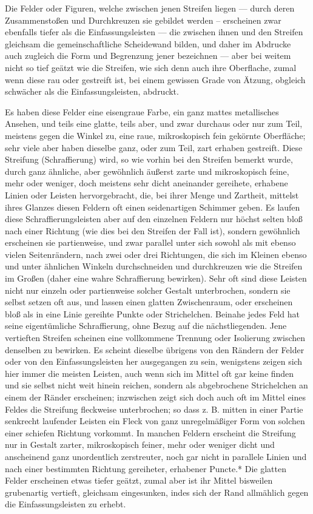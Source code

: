 \documentclass[a4paper, 11pt, oneside, german]{article}
\begin{document}
Die Felder oder Figuren, welche zwischen jenen Streifen liegen --- durch deren Zusammenstoßen und Durchkreuzen sie gebildet werden -- erscheinen zwar ebenfalls tiefer als die Einfassungsleisten --- die zwischen ihnen und den Streifen gleichsam die gemeinschaftliche Scheidewand bilden, und daher im Abdrucke auch zugleich die Form und Begrenzung jener bezeichnen --- aber bei weitem nicht so tief geätzt wie die Streifen, wie sich denn auch ihre Oberflache, zumal wenn diese rau oder gestreift ist, bei einem gewissen Grade von Ätzung, obgleich schwächer als die Einfassungsleisten, abdruckt.

Es haben diese Felder eine eisengraue Farbe, ein ganz mattes metallisches Ansehen, und teils eine glatte, teils aber, und zwar durchaus oder nur zum Teil, meistens gegen die Winkel zu, eine raue, mikroskopisch fein gekörnte Oberfläche; sehr viele aber haben dieselbe ganz, oder zum Teil, zart erhaben gestreift. Diese Streifung (Schraffierung) wird, so wie vorhin bei den Streifen bemerkt wurde, durch ganz ähnliche, aber gewöhnlich äußerst zarte und mikroskopisch feine, mehr oder weniger, doch meistens sehr dicht aneinander gereihete, erhabene Linien oder Leisten hervorgebracht, die, bei ihrer Menge und Zartheit, mittelst ihres Glanzes diesen Feldern oft einen seidenartigen Schimmer geben. Es laufen diese Schraffierungsleisten aber auf den einzelnen Feldern nur höchst selten bloß nach einer Richtung (wie dies bei den Streifen der Fall ist), sondern gewöhnlich erscheinen sie partienweise, und zwar parallel unter sich sowohl als mit ebenso vielen Seitenrändern, nach zwei oder drei Richtungen, die sich im Kleinen ebenso und unter ähnlichen Winkeln durchschneiden und durchkreuzen wie die Streifen im Großen (daher eine wahre Schraffierung bewirken). Sehr oft sind diese Leisten nicht nur einzeln oder partienweise solcher Gestalt unterbrochen, sondern sie selbst setzen oft aus, und lassen einen glatten Zwischenraum, oder erscheinen bloß als in eine Linie gereihte Punkte oder Strichelchen. Beinahe jedes Feld hat seine eigentümliche Schraffierung, ohne Bezug auf die nächstliegenden. Jene vertieften Streifen scheinen eine vollkommene Trennung oder Isolierung zwischen denselben zu bewirken. Es scheint dieselbe übrigens von den Rändern der Felder oder von den Einfassungsleisten her ausgegangen zu sein, wenigstens zeigen sich hier immer die meisten Leisten, auch wenn sich im Mittel oft gar keine finden und sie selbst nicht weit hinein reichen, sondern als abgebrochene Strichelchen an einem der Ränder erscheinen; inzwischen zeigt sich doch auch oft im Mittel eines Feldes die Streifung fleckweise unterbrochen; so dass z. B. mitten in einer Partie senkrecht laufender Leisten ein Fleck von ganz unregelmäßiger Form von solchen einer schiefen Richtung vorkommt. In manchen Feldern erscheint die Streifung nur in Gestalt zarter, mikroskopisch feiner, mehr oder weniger dicht und anscheinend ganz unordentlich zerstreuter, noch gar nicht in parallele Linien und nach einer bestimmten Richtung gereiheter, erhabener Puncte.* Die glatten Felder erscheinen etwas tiefer geätzt, zumal aber ist ihr Mittel bisweilen grubenartig vertieft, gleichsam eingesunken, indes sich der Rand allmählich gegen die Einfassungsleisten zu erhebt.
\end{document}
